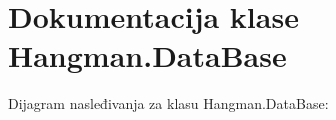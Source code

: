 \hypertarget{classHangman_1_1DataBase}{}\section{Dokumentacija klase Hangman.\+Data\+Base}
\label{classHangman_1_1DataBase}


Dijagram nasleđivanja za klasu Hangman.\+Data\+Base\+:
